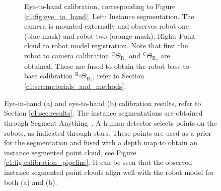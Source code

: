 \begin{figure}
\begin{subfigure}[b]{\textwidth}
         \caption{Eye-to-hand calibration, corresponding to Figure \ref{c1:fig:eye_to_hand}. Left: Instance segmentation. The camera is mounted externally and observes robot one (blue mask) and robot two (orange mask). Right: Point cloud to robot model registration. Note that first the robot to camera calibration $^\text{C}\Theta_{\text{R}_1}$ and $^\text{C}\Theta_{\text{R}_2}$ are obtained. These are fused to obtain the robot base-to-base calibration $^{\text{R}_2}\Theta_{\text{R}_1}$, refer to Section \ref{c1:sec:materials_and_methods}.}
         \label{c1:fig:double_registration}
     \end{subfigure}
     \caption{Eye-in-hand (a) and eye-to-hand (b) calibration results, refer to Section \ref{c1:sec:results}. The instance segmentations are obtained through Segment Anything~\citep{segment_anything}. A human detector selects points on the robots, as indicated through stars. These points are used as a prior for the segmentation and fused with a depth map to obtain an instance segmented point cloud, see Figure \ref{c1:fig:calibration_pipeline}. It can be seen that the observed instance segmented point clouds align well with the robot model for both (a) and (b).}
     \label{c1:fig:registration_results}
\end{figure}

